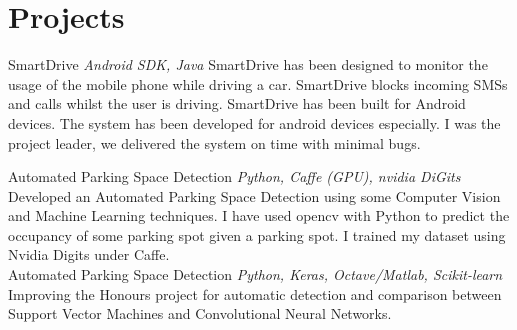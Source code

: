 \documentclass[letterpaper]{moderncv}        %
\begin{document}
\section{Projects}
\cventry
{}
{SmartDrive}
{}
{\textit{Android SDK, Java}}
{}
{SmartDrive has been designed to monitor the usage of the mobile phone while driving a car. SmartDrive blocks incoming SMSs and calls whilst the user is driving. SmartDrive has been built for Android devices. The system has been developed for android devices especially. I was the project leader, we delivered the system on time with minimal bugs.\\}
	\vspace{1mm}

		\cventry
		{}
		{Automated Parking Space Detection}
		{}
		{\textit{Python, Caffe (GPU), nvidia DiGits}}
		{}
		{Developed an Automated Parking Space Detection using some Computer Vision and Machine Learning techniques. I have used opencv with Python to predict the occupancy of some parking spot given a parking spot. I trained my dataset using Nvidia Digits under Caffe.\\}
			\vspace{1mm}
			\cventry
			{}
			{Automated Parking Space Detection}
			{}
			{\textit{Python, Keras, Octave/Matlab, Scikit-learn}}
			{}
			{Improving the Honours project for automatic detection and comparison between Support Vector Machines and Convolutional Neural Networks.\\}
				\vspace{1mm}
\end{document}
